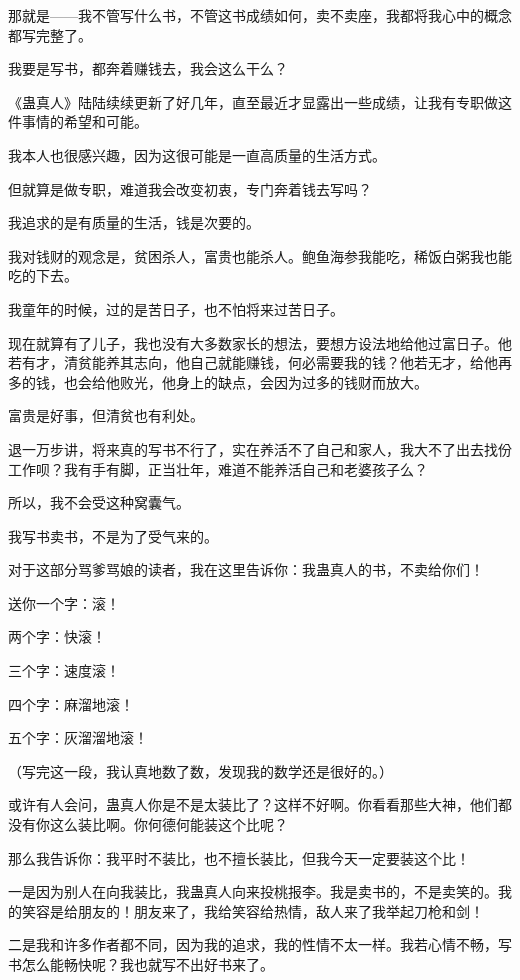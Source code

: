\begin{this_body}
那就是——我不管写什么书，不管这书成绩如何，卖不卖座，我都将我心中的概念都写完整了。

我要是写书，都奔着赚钱去，我会这么干么？

《蛊真人》陆陆续续更新了好几年，直至最近才显露出一些成绩，让我有专职做这件事情的希望和可能。

我本人也很感兴趣，因为这很可能是一直高质量的生活方式。

但就算是做专职，难道我会改变初衷，专门奔着钱去写吗？

我追求的是有质量的生活，钱是次要的。

我对钱财的观念是，贫困杀人，富贵也能杀人。鲍鱼海参我能吃，稀饭白粥我也能吃的下去。

我童年的时候，过的是苦日子，也不怕将来过苦日子。

现在就算有了儿子，我也没有大多数家长的想法，要想方设法地给他过富日子。他若有才，清贫能养其志向，他自己就能赚钱，何必需要我的钱？他若无才，给他再多的钱，也会给他败光，他身上的缺点，会因为过多的钱财而放大。

富贵是好事，但清贫也有利处。

退一万步讲，将来真的写书不行了，实在养活不了自己和家人，我大不了出去找份工作呗？我有手有脚，正当壮年，难道不能养活自己和老婆孩子么？

所以，我不会受这种窝囊气。

我写书卖书，不是为了受气来的。

对于这部分骂爹骂娘的读者，我在这里告诉你：我蛊真人的书，不卖给你们！

送你一个字：滚！

两个字：快滚！

三个字：速度滚！

四个字：麻溜地滚！

五个字：灰溜溜地滚！

（写完这一段，我认真地数了数，发现我的数学还是很好的。）

或许有人会问，蛊真人你是不是太装比了？这样不好啊。你看看那些大神，他们都没有你这么装比啊。你何德何能装这个比呢？

那么我告诉你：我平时不装比，也不擅长装比，但我今天一定要装这个比！

一是因为别人在向我装比，我蛊真人向来投桃报李。我是卖书的，不是卖笑的。我的笑容是给朋友的！朋友来了，我给笑容给热情，敌人来了我举起刀枪和剑！

二是我和许多作者都不同，因为我的追求，我的性情不太一样。我若心情不畅，写书怎么能畅快呢？我也就写不出好书来了。


\end{this_body}
